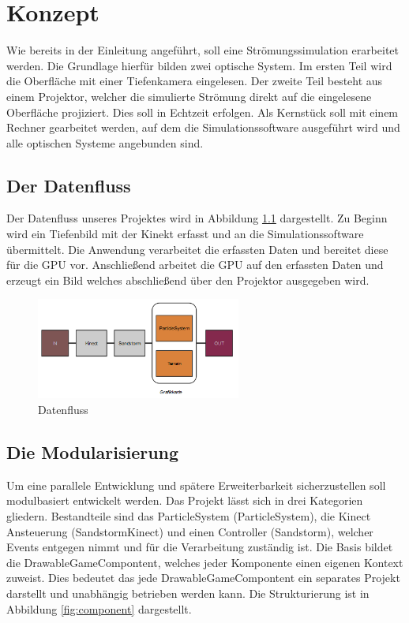 \chapter{Konzept}
\begin{Spacing}{\mylinespace}

Wie bereits in der Einleitung angeführt, soll eine Strömungssimulation erarbeitet werden. Die Grundlage hierfür bilden zwei optische System. Im ersten Teil wird die Oberfläche mit einer Tiefenkamera eingelesen. Der zweite Teil besteht aus einem Projektor, welcher die simulierte Strömung direkt auf die eingelesene Oberfläche projiziert. Dies soll in Echtzeit erfolgen. Als Kernstück soll mit einem Rechner gearbeitet werden, auf dem die Simulationssoftware ausgeführt wird und alle optischen Systeme angebunden sind.

\section{Der Datenfluss}
Der Datenfluss unseres Projektes  wird in Abbildung \ref{fig:dataFlow} dargestellt. Zu Beginn wird ein Tiefenbild mit der Kinekt erfasst und an die Simulationssoftware übermittelt. Die Anwendung verarbeitet die erfassten Daten und bereitet diese für die GPU vor. Anschließend arbeitet die GPU auf den erfassten Daten und erzeugt ein Bild welches abschließend über den Projektor ausgegeben wird.

\begin{figure}[h!]
	\centering
	\vspace*{20px}
	\includegraphics[width=0.6\textwidth]{graphics/flow.png}
	\caption{Datenfluss}
	\label{fig:dataFlow}
\end{figure}

\section{Die Modularisierung}
Um eine parallele Entwicklung und spätere Erweiterbarkeit sicherzustellen soll modulbasiert entwickelt werden. Das Projekt lässt sich in drei Kategorien gliedern. Bestandteile sind das ParticleSystem (ParticleSystem), die Kinect Ansteuerung (SandstormKinect) und einen Controller (Sandstorm), welcher Events entgegen nimmt und für die Verarbeitung zuständig ist. Die Basis bildet die DrawableGameCompontent, welches jeder Komponente einen eigenen Kontext zuweist. Dies bedeutet das jede DrawableGameCompontent ein separates Projekt darstellt und unabhängig betrieben werden kann. Die Strukturierung ist in Abbildung \ref{fig:component} dargestellt.


\end{Spacing}
